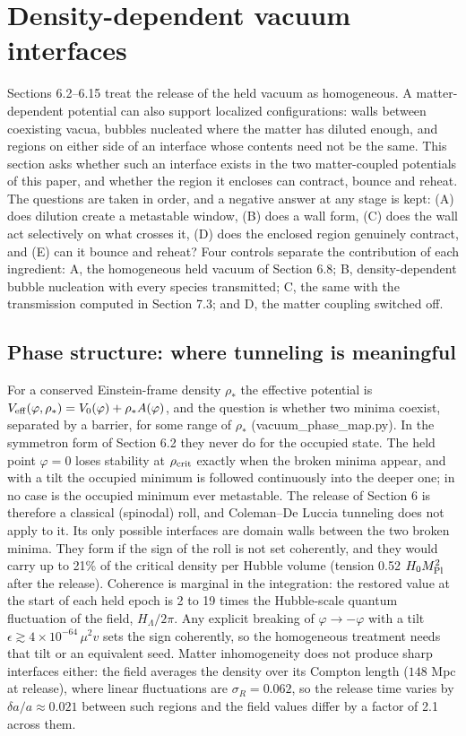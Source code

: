 \documentclass[11pt,a4paper]{article}
\begin{document}
\section{Density-dependent vacuum interfaces}
Sections 6.2--6.15 treat the release of the held vacuum as homogeneous. A matter-dependent potential can also support localized configurations: walls between coexisting vacua, bubbles nucleated where the matter has diluted enough, and regions on either side of an interface whose contents need not be the same. This section asks whether such an interface exists in the two matter-coupled potentials of this paper, and whether the region it encloses can contract, bounce and reheat. The questions are taken in order, and a negative answer at any stage is kept: (A) does dilution create a metastable window, (B) does a wall form, (C) does the wall act selectively on what crosses it, (D) does the enclosed region genuinely contract, and (E) can it bounce and reheat? Four controls separate the contribution of each ingredient: A, the homogeneous held vacuum of Section 6.8; B, density-dependent bubble nucleation with every species transmitted; C, the same with the transmission computed in Section 7.3; and D, the matter coupling switched off.

\subsection{Phase structure: where tunneling is meaningful}
For a conserved Einstein-frame density $\rho_*$ the effective potential is $V_{\rm eff}(\varphi,\rho_*)=V_0(\varphi)+\rho_*A(\varphi)$, and the question is whether two minima coexist, separated by a barrier, for some range of $\rho_*$ (vacuum\_phase\_map.py). In the symmetron form of Section 6.2 they never do for the occupied state. The held point $\varphi=0$ loses stability at $\rho_{\rm crit}$ exactly when the broken minima appear, and with a tilt the occupied minimum is followed continuously into the deeper one; in no case is the occupied minimum ever metastable. The release of Section 6 is therefore a classical (spinodal) roll, and Coleman--De Luccia tunneling does not apply to it. Its only possible interfaces are domain walls between the two broken minima. They form if the sign of the roll is not set coherently, and they would carry up to 21\% of the critical density per Hubble volume (tension 0.52 $H_0M_{\rm Pl}^2$ after the release). Coherence is marginal in the integration: the restored value at the start of each held epoch is 2 to 19 times the Hubble-scale quantum fluctuation of the field, $H_\Lambda/2\pi$. Any explicit breaking of $\varphi\to-\varphi$ with a tilt $\epsilon\gtrsim4\times10^{-64}\,\mu^2v$ sets the sign coherently, so the homogeneous treatment needs that tilt or an equivalent seed. Matter inhomogeneity does not produce sharp interfaces either: the field averages the density over its Compton length ($148$ Mpc at release), where linear fluctuations are $\sigma_R=0.062$, so the release time varies by $\delta a/a\approx0.021$ between such regions and the field values differ by a factor of 2.1 across them.
\end{document}
